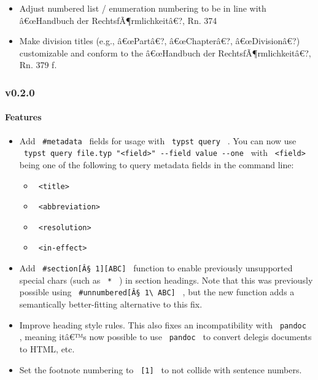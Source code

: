 \begin{itemize}
\tightlist
\item
  Adjust numbered list / enumeration numbering to be in line with
  â€œHandbuch der RechtsfÃ¶rmlichkeitâ€?, Rn. 374
\item
  Make division titles (e.g., â€œPartâ€?, â€œChapterâ€?, â€œDivisionâ€?)
  customizable and conform to the â€œHandbuch der
  RechtsfÃ¶rmlichkeitâ€?, Rn. 379 f.
\end{itemize}

\subsubsection{v0.2.0}\label{v0.2.0}

\paragraph{Features}\label{features-1}

\begin{itemize}
\tightlist
\item
  Add \texttt{\ \#metadata\ } fields for usage with
  \texttt{\ typst\ query\ } . You can now use
  \texttt{\ typst\ query\ file.typ\ "\textless{}field\textgreater{}"\ -\/-field\ value\ -\/-one\ }
  with \texttt{\ \textless{}field\textgreater{}\ } being one of the
  following to query metadata fields in the command line:

  \begin{itemize}
  \tightlist
  \item
    \texttt{\ \textless{}title\textgreater{}\ }
  \item
    \texttt{\ \textless{}abbreviation\textgreater{}\ }
  \item
    \texttt{\ \textless{}resolution\textgreater{}\ }
  \item
    \texttt{\ \textless{}in-effect\textgreater{}\ }
  \end{itemize}
\item
  Add \texttt{\ \#section{[}Â§\ 1{]}{[}ABC{]}\ } function to enable
  previously unsupported special chars (such as \texttt{\ *\ } ) in
  section headings. Note that this was previously possible using
  \texttt{\ \#unnumbered{[}Â§\ 1\textbackslash{}\ ABC{]}\ } , but the
  new function adds a semantically better-fitting alternative to this
  fix.
\item
  Improve heading style rules. This also fixes an incompatibility with
  \texttt{\ pandoc\ } , meaning itâ€™s now possible to use
  \texttt{\ pandoc\ } to convert delegis documents to HTML, etc.
\item
  Set the footnote numbering to \texttt{\ {[}1{]}\ } to not collide with
  sentence numbers.
\end{itemize}

